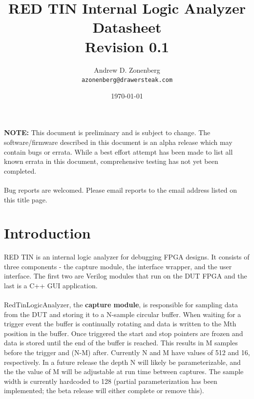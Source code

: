 \documentclass[pdftex]{article}
\begin{document}
\pagestyle{fancy}

\title{RED TIN Internal Logic Analyzer Datasheet\\Revision 0.1}
\author{Andrew D. Zonenberg\\
	\texttt{azonenberg@drawersteak.com}}
\date{\today}
\maketitle

\paragraph*{}
{\bf NOTE: } This document is preliminary and is subject to change. The software/firmware described in this document is
an alpha release which may contain bugs or errata. While a best effort attempt has been made to list all known errata
in this document, comprehensive testing has not yet been completed.

\paragraph*{}
Bug reports are welcomed. Please email reports to the email address listed on this title page.

\pagebreak
\tableofcontents
\pagebreak

\pagebreak
\section{Introduction} 

\paragraph*{}
RED TIN is an internal logic analyzer for debugging FPGA designs. It consists of three components - the capture module,
the interface wrapper, and the user interface. The first two are Verilog modules that run on the DUT FPGA and the last
is a C++ GUI application.

\paragraph*{}
RedTinLogicAnalyzer, the {\bf capture module}, is responsible for sampling data from the DUT and storing it to a
N-sample circular buffer. When waiting for a trigger event the buffer is continually rotating and data is written to the
Mth position in the buffer. Once triggered the start and stop pointers are frozen and data is stored until the end of
the buffer is reached. This results in M samples before the trigger and (N-M) after. Currently N and M have values of
512 and 16, respectively. In a future release the depth N will likely be parameterizable, and the the value of M will be
adjustable at run time between captures. The sample width is currently hardcoded to 128 (partial parameterization
has been implemented; the beta release will either complete or remove this).
\end{document}
